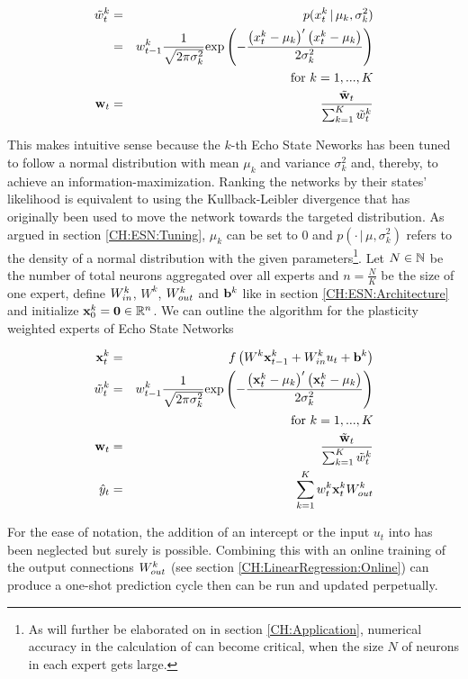 \begin{eqnarray}
    \tilde w_{t}^{k} & = & p(x_t^k \, | \, \mu_k, \sigma_k^2) \nonumber \\ 
    & = & w_{t-1}^{k} \frac{1}{\sqrt{2\pi\sigma_k^2}} \text{exp}\left( - \frac{\left(x^{k}_{t} - \mu_k\right)'\left(x^{k}_{t} - \mu_k\right)}{2\sigma_k^2} \right) \label{EQ:Likelihood}\\
    & & \text{for } k = 1,..., K \nonumber \\
    {\bf w}_t & = & \frac{\tilde {{\bf w}}_t}{\sum_{k=1}^{K}\tilde w_t^k}
\end{eqnarray}

This makes intuitive sense because the $k$-th Echo State Neworks has been tuned to follow a normal distribution with mean $\mu_k$ and variance $\sigma_k^2$ and, thereby, to achieve an information-maximization. Ranking the networks by their states' likelihood is equivalent to using the Kullback-Leibler divergence that has originally been used to move the network towards the targeted distribution.
As argued in section \ref{CH:ESN:Tuning}, $\mu_k$ can be set to $0$ and $p(\cdot \, | \, \mu, \sigma_k^2)$ refers to the density of a normal distribution with the given parameters\footnote{As will further be elaborated on in section \ref{CH:Application}, numerical accuracy in the calculation of  can become critical, when the size $N$ of neurons in each expert gets large.}.
Let $N \in \mathbb{N}$ be the number of total neurons aggregated over all experts and $n = \frac{N}{K}$ be the size of one expert, define $W_{in}^k$, $W^k$, $W_{out}^k$ and ${\bf b}^k$ like in section \ref{CH:ESN:Architecture} and initialize ${\bf x}_0^k = {\bf 0} \in \mathbb{R}^{n}$. We can outline the algorithm for the plasticity weighted experts of Echo State Networks

\begin{eqnarray}
    {\bf x}_{t}^k & = & f\left(W^k{\bf x}_{t-1}^k + W_{in}^k u_t +  {\bf b}^k\right) \\
    \tilde w_{t}^{k} & = & w_{t-1}^{k} \frac{1}{\sqrt{2\pi\sigma_k^2}} \text{exp}\left( -\frac{\left({\bf x}^{k}_{t} - \mu_k\right)'\left({\bf x}^{k}_{t} - \mu_k\right)}{2\sigma_k^2} \right) \label{EQ:PlasticityWeightUpdate}\\
    & & \text{for } k = 1, ..., K \nonumber \\
    {\bf w}_t & = & \frac{\tilde {{\bf w}}_t}{\sum_{k=1}^{K}\tilde w_t^k} \\
    \hat y_t & = & \sum_{k=1}^K w_t^k {\bf x}_{t}^kW_{out}^k \label{EQ:PlasticityPrediction}
\end{eqnarray}

For the ease of notation, the addition of an intercept or the input $u_t$ into  has been neglected but surely is possible.
Combining this with an online training of the output connections $W_{out}^k$ (see section \ref{CH:LinearRegression:Online}) can produce a one-shot prediction cycle then can be run and updated perpetually.

